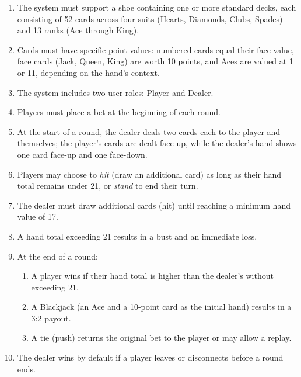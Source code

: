 \begin{enumerate}
\item
\protect{}\label{2aSmOWQ-AbWJ0VMOEgC3-}
The system must support a shoe containing one or more standard decks, each consisting of 52 cards across four suits (Hearts, Diamonds, Clubs, Spades) and 13 ranks (Ace through King).
\item
\protect{}\label{MGzvNKrAN_wKGwoIjzH_w}
Cards must have specific point values: numbered cards equal their face value, face cards (Jack, Queen, King) are worth 10 points, and Aces are valued at 1 or 11, depending on the hand's context.
\item
\protect{}\label{BtOzKGeOo1AAo4lPKa9EP}
The system includes two user roles: Player and Dealer.
\item
\protect{}\label{jLuGcn7sa3HNMpcbJsUJ2}
Players must place a bet at the beginning of each round.
\item
At the start of a round, the dealer deals two cards each to the player and themselves; the player's cards are dealt face-up, while the dealer's hand shows one card face-up and one face-down.
\item
\protect{}\label{zpKXYzUefKtQDEzHDoXzH}
Players may choose to \emph{hit} (draw an additional card) as long as their hand total remains under 21, or \emph{stand} to end their turn.
\item
\protect{}\label{K_dhcLH_GeXxgJ-4xGn5Z}
The dealer must draw additional cards (hit) until reaching a minimum hand value of 17.
\item
\protect{}\label{mzLqA0j17x28tYj8KPEi4}
A hand total exceeding 21 results in a bust and an immediate loss.
\item
\protect{}\label{bEpkJ-DOK5GNlOhb0pPy2}
At the end of a round:

\begin{enumerate}
\item
A player wins if their hand total is higher than the dealer's without exceeding 21.
\item
A Blackjack (an Ace and a 10-point card as the initial hand) results in a 3:2 payout.
\item
A tie (push) returns the original bet to the player or may allow a replay.
\end{enumerate}
\item
\protect{}\label{5GgSUs1PEhu2qvpUlZ-y0}
The dealer wins by default if a player leaves or disconnects before a round ends.
\end{enumerate}


